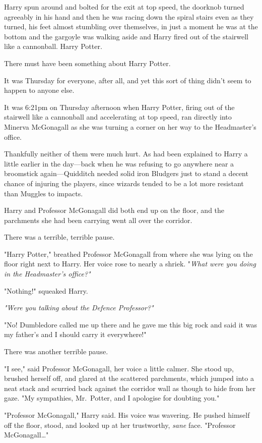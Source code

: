 Harry spun around and bolted for the exit at top speed, the doorknob turned 
agreeably in his hand and then he was racing down the spiral stairs even as 
they turned, his feet almost stumbling over themselves, in just a moment he was 
at the bottom and the gargoyle was walking aside and Harry fired out of the 
stairwell like a cannonball.
\sbreak
Harry Potter.

There must have been something about Harry Potter.

It was Thursday for everyone, after all, and yet this sort of thing didn't seem 
to happen to anyone else.

It was 6:21pm on Thursday afternoon when Harry Potter, firing out of the 
stairwell like a cannonball and accelerating at top speed, ran directly into 
Minerva McGonagall as she was turning a corner on her way to the Headmaster's 
office.

Thankfully neither of them were much hurt. As had been explained to Harry a 
little earlier in the day---back when he was refusing to go anywhere near a 
broomstick again---Quidditch needed solid iron Bludgers just to stand a decent 
chance of injuring the players, since wizards tended to be a lot more resistant 
than Muggles to impacts.

Harry and Professor McGonagall did both end up on the floor, and the parchments 
she had been carrying went all over the corridor.

There was a terrible, terrible pause.

"Harry Potter," breathed Professor McGonagall from where she was lying on the 
floor right next to Harry. Her voice rose to nearly a shriek. "\emph{What were 
you doing in the Headmaster's office?"}

"Nothing!" squeaked Harry.

\emph{"Were you talking about the Defence Professor?"}

"No! Dumbledore called me up there and he gave me this big rock and said it was 
my father's and I should carry it everywhere!"

There was another terrible pause.

"I see," said Professor McGonagall, her voice a little calmer. She stood up, 
brushed herself off, and glared at the scattered parchments, which jumped into 
a neat stack and scurried back against the corridor wall as though to hide from 
her gaze. "My sympathies, Mr.~Potter, and I apologise for doubting you."

"Professor McGonagall," Harry said. His voice was wavering. He pushed himself 
off the floor, stood, and looked up at her trustworthy, \emph{sane} face. 
"Professor McGonagall{\ldots}"


